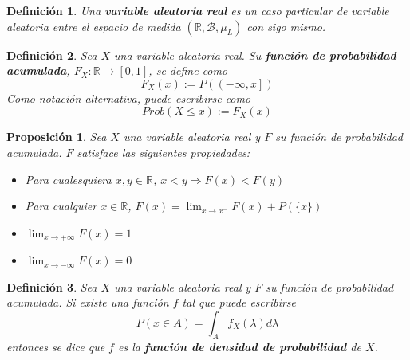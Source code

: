\documentclass[12pt,letterpaper]{book}
\newtheorem{definicion}{Definición}[chapter]
\newtheorem{proposicion}[teorema]{Proposición}
\newcommand{\R}{\mathbb{R}}
\begin{document}
\begin{definicion}
Una \textbf{variable aleatoria real} es un caso particular de variable aleatoria entre el espacio de medida $(\R,\mathcal{B},\mu_L)$ con sigo mismo.
\end{definicion}


\begin{definicion}%
Sea $X$ una variable aleatoria real. Su \textbf{función de probabilidad acumulada}, $F_X : \R \rightarrow [0,1]$, se define como
\begin{equation*}
F_X (x) := P\left( \left(-\infty,x \right] \right)
\end{equation*}
Como notación alternativa, puede escribirse como
\begin{equation}
Prob(X\leq x) := F_X(x) 
\end{equation}
\end{definicion}

\begin{proposicion}
Sea $X$ una variable aleatoria real y $F$ su función de probabilidad acumulada. $F$ satisface las siguientes propiedades:
\begin{itemize}
\item Para cualesquiera $x,y\in \R$, $x < y \Rightarrow F(x) < F(y)$
\item Para cualquier $x\in\R$, $F(x) = \lim_{x\rightarrow x^{-}} F(x) + P(\{x\})$
\item $\lim_{x\rightarrow +\infty} F(x) = 1$
\item $\lim_{x\rightarrow -\infty} F(x) = 0$
\end{itemize}
\end{proposicion}

\begin{definicion}
Sea $X$ una variable aleatoria real y $F$ su función de probabilidad acumulada. Si existe una función $f$  tal que puede escribirse
\begin{equation}
P(x\in A) = \int_A f_X(\lambda) d\lambda 
\end{equation}
entonces se dice que $f$ es la \textbf{función de densidad de probabilidad} de $X$.
\end{definicion}
\end{document}
